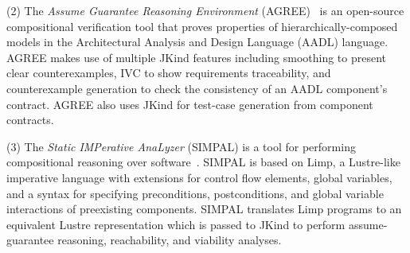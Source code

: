 \documentclass{llncs}
\newcommand{\jkind}{{\sc JKind}\xspace}
\newcommand{\lustre}{{\sc Lustre}\xspace}
\newcommand{\simpal}{{\sc SIMPAL}\xspace}
\newcommand{\limp}{{\sc Limp}\xspace}
\newcommand{\agree}{{\sc AGREE}\xspace}
\renewcommand{\paragraph}[1]{\vspace{5pt}\noindent {\bf #1}}
\newcommand{\application}[2]{
  \paragraph{#1} \hfill {\it #2}
  \vspace{1pt}
}
\begin{document}
(2) The {\em Assume Guarantee Reasoning Environment} (\agree)~\cite{cofer2012nfm,QFCS15:backes,hilt2013} is an open-source compositional verification tool that proves properties of hierarchically-composed models in the Architectural Analysis and Design Language (AADL) language.  %
%
%
%
\agree makes use of multiple \jkind features including smoothing to
present clear counterexamples, IVC to show requirements traceability,
and counterexample generation to check the consistency of an AADL
component's contract. \agree also uses \jkind for test-case generation
from component contracts.

(3) The {\em Static IMPerative AnaLyzer} (\simpal) is a tool for
performing compositional reasoning over
software~\cite{wagner2017spin}. \simpal is based on \limp, a \lustre-like imperative language with extensions for control flow elements, global variables, and a syntax for specifying preconditions, postconditions, and global variable interactions of
preexisting components. \simpal translates \limp programs to an
equivalent \lustre representation which is passed to \jkind to
perform assume-guarantee reasoning, reachability, and viability
analyses. 
\end{document}
